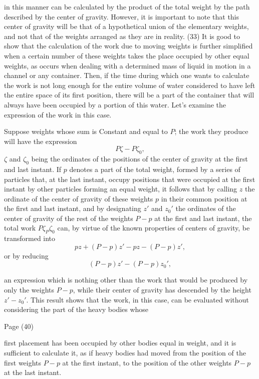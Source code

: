 \documentclass{book}
\begin{document}
\newpage

in this manner can be calculated by the product of the total weight by the path described by the center of gravity. However, it is important to note that this center of gravity will be that of a hypothetical union of the elementary weights, and not that of the weights arranged as they are in reality.
(33)
It is good to show that the calculation of the work due to moving weights is further simplified when a certain number of these weights takes the place occupied by other equal weights, as occurs when dealing with a determined mass of liquid in motion in a channel or any container. Then, if the time during which one wants to calculate the work is not long enough for the entire volume of water considered to have left the entire space of its first position, there will be a part of the container that will always have been occupied by a portion of this water. Let's examine the expression of the work in this case.

Suppose weights whose sum is Constant and equal to \(P\); the work they produce will have the expression \[P\zeta - P\zeta_0,\] \(\zeta\) and \(\zeta_0\) being the ordinates of the positions of the center of gravity at the first and last instant. If \(p\) denotes a part of the total weight, formed by a series of particles that, at the last instant, occupy positions that were occupied at the first instant by other particles forming an equal weight, it follows that by calling \(z\) the ordinate of the center of gravity of these weights \(p\) in their common position at the first and last instant, and by designating \(z'\) and \(z_0'\) the ordinates of the center of gravity of the rest of the weights 
\(P-p\) at the first and last instant, the total work \(P\zeta_P\zeta_0\) can, by virtue of the known properties of centers of gravity, be transformed into
\[pz+(P-p)z'-pz-(P-p)z',\]  
or by reducing
\[(P-p)z'-(P-p)z_0',\]  


an expression which is nothing other than the work that would be produced by only the weights \(P-p\), while their center of gravity has descended by the height \(z'-z_0'\). This result shows that the work, in this case, can be evaluated without considering the part of the heavy bodies whose 

\newpage
Page (40) \\
\begin{comment}
This passage describes the calculation of work in fluid dynamics, particularly with water flow in canals, and introduces the concept of work due to mutual reactions, using the example of repulsive forces in a spring system.
\end{comment}
first placement has been occupied by other bodies equal in weight, and it is sufficient to calculate it, as if heavy bodies had moved from the position of the first weights \(P-p\) at the first instant, to the position of the other weights \(P-p\) at the last instant.
\end{document}
